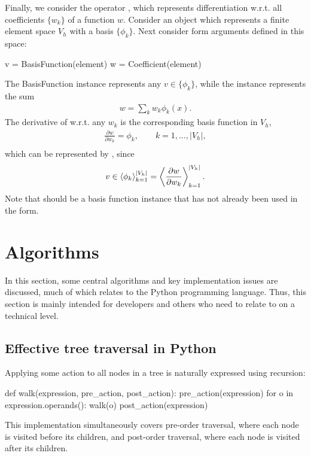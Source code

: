 Finally, we consider the operator , which represents
differentiation w.r.t. all coefficients $\{w_k\}$ of a function $w$.
Consider an object  which represents a finite element
space $V_h$ with a basis $\{\phi_k\}$.  Next consider form arguments
defined in this space:
\begin{python}
v = BasisFunction(element)
w = Coefficient(element)
\end{python}
The BasisFunction instance  represents any $v\in\{\phi_k\}$,
while the  instance  represents the sum
\begin{align}
w = \sum_k w_k \phi_k(x).
\end{align}
The derivative of  w.r.t. any $w_k$ is the corresponding basis function in $V_h$,
\begin{align}
\frac{\partial w}{\partial w_k} = \phi_k, \qquad k = 1, \ldots, |V_h|, \\
\end{align}
which can be represented by , since
\begin{align}
v \in \left\langle{ \phi_k }\right\rangle_{k=1}^{|V_h|} = \left\langle{ \frac{\partial w}{\partial w_k} }\right\rangle_{k=1}^{|V_h|}.
\end{align}
Note that  should be a basis function instance that has not
already been used in the form.

\section{Algorithms} \label{ufl:sec:algorithms}

In this section, some central algorithms and key implementation issues
are discussed, much of which relates to the Python programming
language.  Thus, this section is mainly intended for developers and
others who need to relate to \ufl{} on a technical level.

\subsection{Effective tree traversal in Python} \label{ufl:sec:traversal}

Applying some action to all nodes in a tree is naturally expressed
using recursion:
\begin{python}
def walk(expression, pre_action, post_action):
    pre_action(expression)
    for o in expression.operands():
        walk(o)
    post_action(expression)
\end{python}
This implementation simultaneously covers pre-order traversal, where
each node is visited before its children, and post-order traversal,
where each node is visited after its children.

